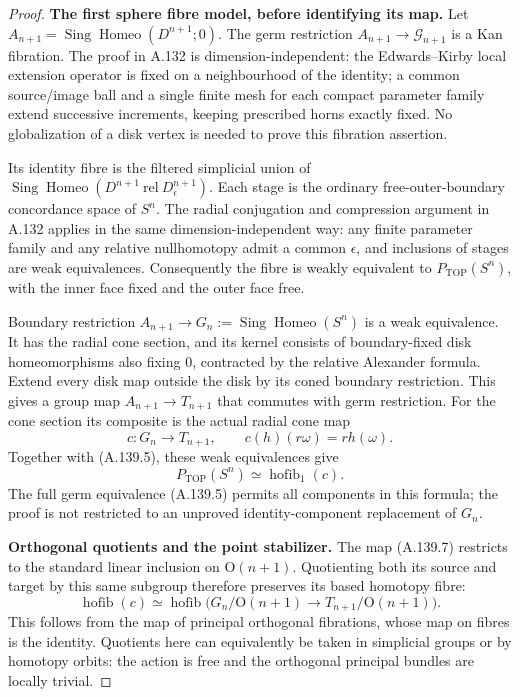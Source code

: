 \begin{proof}
\textbf{The first sphere fibre model, before identifying its map.}
Let $A_{n+1}=\operatorname{Sing}\operatorname{Homeo}(D^{n+1};0)$.
The germ restriction
$A_{n+1}\to\mathcal G_{n+1}$ is a Kan fibration. The proof in
A.132 is dimension-independent: the Edwards--Kirby local extension
operator is fixed on a neighbourhood of the identity; a common
source/image ball and a single finite mesh for each compact
parameter family extend successive increments, keeping prescribed
horns exactly fixed. No globalization of a disk vertex is needed
to prove this fibration assertion.

Its identity fibre is the filtered simplicial union of
$\operatorname{Sing}\operatorname{Homeo}(D^{n+1}\ \mathrm{rel}\
D_\epsilon^{n+1})$. Each stage is the ordinary free-outer-boundary
concordance space of $S^n$. The radial conjugation and compression
argument in A.132 applies in the same dimension-independent way:
any finite parameter family and any relative nullhomotopy admit a
common $\epsilon$, and inclusions of stages are weak equivalences.
Consequently the fibre is weakly equivalent to
$P_{\mathrm{TOP}}(S^n)$, with the inner face fixed and the outer
face free.

Boundary restriction $A_{n+1}\to
G_n:=\operatorname{Sing}\operatorname{Homeo}(S^n)$ is a weak
equivalence. It has the radial cone section, and its kernel consists
of boundary-fixed disk homeomorphisms also fixing $0$, contracted
by the relative Alexander formula. Extend every disk map outside
the disk by its coned boundary restriction. This gives a group map
$A_{n+1}\to T_{n+1}$ that commutes with germ restriction.
For the cone section its composite is the actual radial cone map
\[
 c:G_n\longrightarrow T_{n+1},\qquad
 c(h)(r\omega)=r h(\omega).                             \tag{A.139.7}
\]
Together with (A.139.5), these weak equivalences give
\[
 P_{\mathrm{TOP}}(S^n)\simeq\operatorname{hofib}_1(c).
                                                               \tag{A.139.8}
\]
The full germ equivalence (A.139.5) permits all components in this
formula; the proof is not restricted to an unproved identity-component
replacement of $G_n$.

\textbf{Orthogonal quotients and the point stabilizer.}
The map (A.139.7) restricts to the standard linear inclusion on
$\mathrm O(n+1)$. Quotienting both its source and target by this
same subgroup therefore preserves its based homotopy fibre:
\[
 \operatorname{hofib}(c)\simeq
 \operatorname{hofib}\bigl(
 G_n/\mathrm O(n+1)\longrightarrow
 T_{n+1}/\mathrm O(n+1)\bigr).                          \tag{A.139.9}
\]
This follows from the map of principal orthogonal fibrations,
whose map on fibres is the identity. Quotients here can equivalently
be taken in simplicial groups or by homotopy orbits: the action is
free and the orthogonal principal bundles are locally trivial.


\end{proof}
